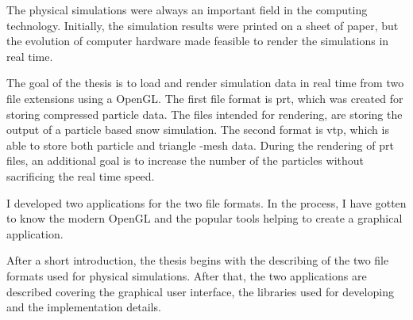 The physical simulations were always an important field
in the computing technology.
Initially, the simulation results were printed on a sheet of paper,
but the evolution of computer hardware made feasible to
render the simulations in real time.

The goal of the thesis is
to load and render simulation data in real time 
from two file extensions using a OpenGL.
The first file format is prt, 
which was created for storing compressed particle data.
The files intended for rendering,
are storing the output of a particle based snow simulation.
The second format is vtp,
which is able to store both particle and triangle -mesh data.
During the rendering of prt files,
an additional goal is to increase the number
of the particles without sacrificing the real time speed.

I developed two applications for the two file formats.
In the process, 
I have gotten to know the modern OpenGL 
and the popular tools helping to create a graphical application.

After a short introduction, 
the thesis begins with the
describing of the two file formats 
used for physical simulations. 
After that, the two applications are 
described covering the graphical user interface, 
the libraries used for developing 
and the implementation details.










